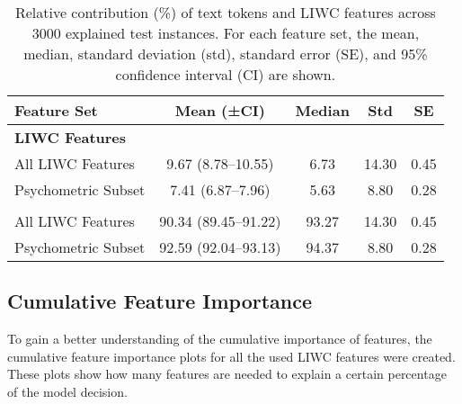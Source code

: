 \begin{table}[h!]
\centering
\caption[Relative contribution of text tokens and LIWC features.]{Relative contribution (\%) of text tokens and LIWC features across 3000 explained test instances. For each feature set, the mean, median, standard deviation (std), standard error (SE), and 95\% confidence interval (CI) are shown.}
\label{tab:liwc_vs_tokens}
\begin{tabular}{lcccc}
\toprule
\textbf{Feature Set} & \textbf{Mean (±CI)} & \textbf{Median} & \textbf{Std} & \textbf{SE} \\
\midrule
\multicolumn{5}{l}{\textbf{LIWC Features}} \\
All LIWC Features     & 9.67 (8.78–10.55) & 6.73 & 14.30 & 0.45 \\
Psychometric Subset   & 7.41 (6.87–7.96)  & 5.63 &  8.80 & 0.28 \\
\addlinespace[0.3em]
\midrule
\multicolumn{5}{l}{\textbf{Text Tokens}} \\
All LIWC Features     & 90.34 (89.45–91.22) & 93.27 & 14.30 & 0.45 \\
Psychometric Subset   & 92.59 (92.04–93.13) & 94.37 &  8.80 & 0.28 \\
\bottomrule
\end{tabular}
\end{table}


\subsection{Cumulative Feature Importance}

To gain a better understanding of the cumulative importance of features, the cumulative feature importance plots for all the used LIWC features were created. These plots show how many features are needed to explain a certain percentage of the model decision.

